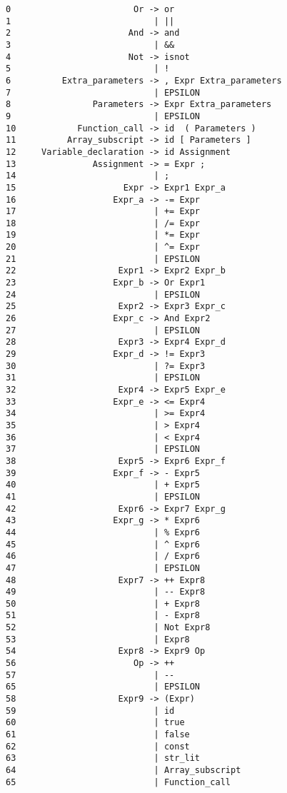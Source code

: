 \documentclass[11pt]{article}
\begin{document}
\begin{verbatim}
0                        Or -> or 
1                            | ||
2                       And -> and
3                            | &&
4                       Not -> isnot
5                            | !
6          Extra_parameters -> , Expr Extra_parameters 
7                            | EPSILON
8                Parameters -> Expr Extra_parameters 
9                            | EPSILON
10            Function_call -> id  ( Parameters )
11          Array_subscript -> id [ Parameters ]
12     Variable_declaration -> id Assignment
13               Assignment -> = Expr ;
14                           | ;
15                     Expr -> Expr1 Expr_a
16                   Expr_a -> -= Expr
17                           | += Expr
18                           | /= Expr		
19                           | *= Expr		
20                           | ^= Expr		
21                           | EPSILON
22                    Expr1 -> Expr2 Expr_b
23                   Expr_b -> Or Expr1		
24                           | EPSILON
25                    Expr2 -> Expr3 Expr_c
26                   Expr_c -> And Expr2		
27                           | EPSILON
28                    Expr3 -> Expr4 Expr_d
29                   Expr_d -> != Expr3
30                           | ?= Expr3 
31                           | EPSILON
32                    Expr4 -> Expr5 Expr_e
33                   Expr_e -> <= Expr4
34                           | >= Expr4
35                           | > Expr4
36                           | < Expr4					  
37                           | EPSILON
38                    Expr5 -> Expr6 Expr_f
39                   Expr_f -> - Expr5
40                           | + Expr5					  
41                           | EPSILON
42                    Expr6 -> Expr7 Expr_g
43                   Expr_g -> * Expr6
44                           | % Expr6
45                           | ^ Expr6
46                           | / Expr6	  
47                           | EPSILON
48                    Expr7 -> ++ Expr8
49                           | -- Expr8
50                           | + Expr8
51                           | - Expr8
52                           | Not Expr8
53                           | Expr8
54                    Expr8 -> Expr9 Op
56                       Op -> ++
57                           | --
65                           | EPSILON
58                    Expr9 -> (Expr)		 
59                           | id
60                           | true
61                           | false
62                           | const
63                           | str_lit
64                           | Array_subscript
65                           | Function_call
\end{verbatim}
\end{document}
